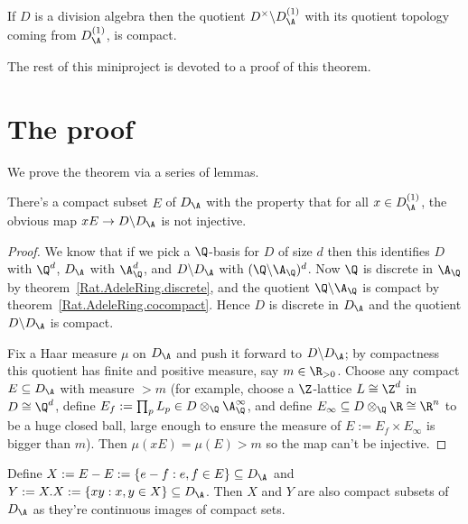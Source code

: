 \begin{theorem}
  \label{AdeleRing.DivisionAlgebra.compact_quotient} If $D$ is a division algebra then
  the quotient $D^\times\backslash D_{\A}^{(1)}$
  with its quotient topology coming from $D_{\A}^{(1)}$, is compact.
\end{theorem}

The rest of this miniproject is devoted to a proof of this theorem.

\section{The proof}

We prove the theorem via a series of lemmas.

\begin{lemma}
  \label{E}
  There's a compact subset $E$ of $D_{\A}$
  with the property that for all $x\in D_{\A}^{(1)}$,
  the obvious map $xE\to D\backslash D_{\A}$ is not injective.
\end{lemma}

\begin{proof} We know that if we pick a $\Q$-basis for $D$
  of size $d$ then this identifies $D$ with $\Q^d$,
  $D_{\A}$ with $\A_{\Q}^d$, and $D\backslash D_{\A}$ with
  $(\Q\backslash\A_{\Q})^d$. Now $\Q$ is discrete in $\A_{\Q}$
  by theorem~\ref{Rat.AdeleRing.discrete}, and the quotient
  $\Q\backslash \A_{\Q}$ is compact by theorem~\ref{Rat.AdeleRing.cocompact}.
  Hence $D$ is discrete in $D_{\A}$
  and the quotient $D\backslash D_{\A}$ is compact.

    Fix a Haar measure $\mu$ on $D_{\A}$ and push it forward
    to $D\backslash D_{\A}$; by compactness this quotient has finite
    and positive measure, say $m\in\R_{>0}$.
    Choose any compact $E\subseteq D_{\A}$ with measure $> m$
    (for example, choose a $\Z$-lattice $L\cong\Z^d$ in $D\cong\Q^d$,
    define $E_f:=\prod_p L_p\in D\otimes_{\Q}\A_{\Q}^\infty$,
    and define $E_{\infty}\subseteq D\otimes_{\Q}\R\cong\R^n$ to be a huge closed
    ball, large enough to ensure the measure of $E:=E_f\times E_{\infty}$ is bigger than $m$).
    Then $\mu(xE)=\mu(E)>m$ so the map can't be injective.
\end{proof}

Define $X:=E-E:=\{e-f:e,f\in E\}\subseteq D_{\A}$ and $Y:=X.X:=\{xy:x,y\in X\}\subseteq D_{\A}$.
  Then $X$ and $Y$ are
  also compact subsets of $D_{\A}$ as they're continuous images
  of compact sets.

